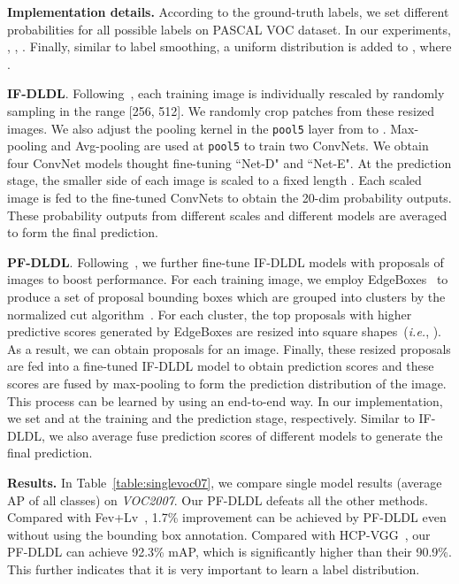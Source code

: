 \documentclass[journal]{IEEEtran}
\begin{document}
\textbf{Implementation details.}
 According to the ground-truth labels, we set different probabilities for all possible labels on PASCAL VOC dataset. In our experiments,
 , , . Finally, similar to label smoothing, a uniform distribution  is added to , where .

\textbf{IF-DLDL}. Following~\cite{simonyan2015very}, each training image is individually rescaled by randomly sampling in the range [256, 512]. We randomly crop  patches from these resized images. We also adjust the pooling kernel in the \texttt{pool5} layer from  to . Max-pooling and Avg-pooling are used at \texttt{pool5} to train two ConvNets. We obtain four ConvNet models thought fine-tuning ``Net-D" and ``Net-E". At the prediction stage, the smaller side of each image is scaled to a fixed length . Each scaled image is fed to the fine-tuned ConvNets to obtain the 20-dim probability outputs. These probability outputs from different scales and different models are averaged to form the final prediction.

\textbf{PF-DLDL}. Following~\cite{wei2015hcp}, we further fine-tune IF-DLDL models with proposals of images to boost performance. For each training image, we employ EdgeBoxes~\cite{zitnick2014edge} to produce a set of proposal bounding boxes which are grouped into  clusters by the normalized cut algorithm~\cite{shi2000normalized}. For each cluster, the top  proposals with higher predictive scores generated by EdgeBoxes are resized into square shapes~(\emph{i.e.}, ). As a result, we can obtain  proposals for an image. Finally, these  resized proposals are fed into a fine-tuned IF-DLDL model to obtain prediction scores and these scores are fused by max-pooling to form the prediction distribution of the image. This process can be learned by using an end-to-end way. In our implementation, we set  and  at the training and the prediction stage, respectively.
Similar to IF-DLDL, we also average fuse prediction scores of different models to generate the final prediction.


\textbf{Results.}
In Table~\ref{table:singlevoc07}, we compare single model results (average AP of all classes) on \emph{VOC2007}. Our PF-DLDL defeats all the other methods. Compared with Fev+Lv~\cite{yang2016exp}, 1.7\% improvement can be achieved by PF-DLDL even without using the bounding box annotation. Compared with HCP-VGG~\cite{wei2015hcp}, our PF-DLDL can achieve 92.3\% mAP, which is significantly higher than their 90.9\%. This further indicates that it is very important to learn a label distribution.
\end{document}
